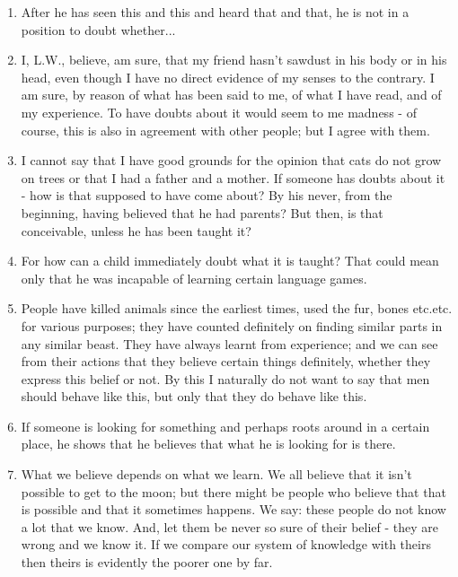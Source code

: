 \documentclass{book}
\begin{document}
\begin{enumerate}
\item
After he has seen this and this and heard that and that, he is not in a
position to doubt whether...

\item
I, L.W., believe, am sure, that my friend hasn't sawdust in his body or in his
head, even though I have no direct evidence of my senses to the contrary. I am
sure, by reason of what has been said to me, of what I have read, and of my
experience. To have doubts about it would seem to me madness - of course, this
is also in agreement with other people; but I agree with them.

\item
I cannot say that I have good grounds for the opinion that cats do not grow on
trees or that I had a father and a mother.  If someone has doubts about it -
how is that supposed to have come about? By his never, from the beginning,
having believed that he had parents? But then, is that conceivable, unless he
has been taught it?

\item
For how can a child immediately doubt what it is taught? That could mean only
that he was incapable of learning certain language games.

\item
People have killed animals since the earliest times, used the fur, bones
etc.etc. for various purposes; they have counted definitely on finding similar
parts in any similar beast.  They have always learnt from experience; and we
can see from their actions that they believe certain things definitely, whether
they express this belief or not. By this I naturally do not want to say that
men should behave like this, but only that they do behave like this.

\item
If someone is looking for something and perhaps roots around in a certain
place, he shows that he believes that what he is looking for is there.

\item
What we believe depends on what we learn. We all believe that it isn't possible
to get to the moon; but there might be people who believe that that is possible
and that it sometimes happens. We say: these people do not know a lot that we
know. And, let them be never so sure of their belief - they are wrong and we
know it.  If we compare our system of knowledge with theirs then theirs is
evidently the poorer one by far.


\end{enumerate}
\end{document}
